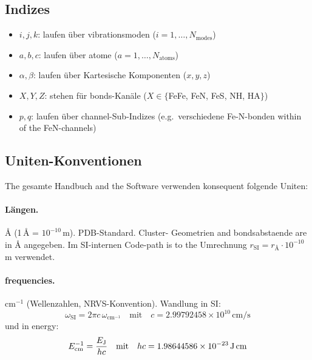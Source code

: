 \documentclass[11pt,a4paper,twoside]{article}
\providecommand{\angstrom}{\text{\AA}}    %
\theoremstyle{remark}
\begin{document}
\subsection{Indizes}

\begin{itemize}\setlength{\itemsep}{2pt}
  \item $i, j, k$: laufen \"uber vibrationsmoden ($i = 1, \ldots,
        N_\text{modes}$)
  \item $a, b, c$: laufen \"uber atome ($a = 1, \ldots, N_\text{atoms}$)
  \item $\alpha, \beta$: laufen \"uber Kartesische Komponenten
        ($x, y, z$)
  \item $X, Y, Z$: stehen f\"ur bonds-Kan\"ale
        ($X \in \{$FeFe, FeN, FeS, NH, HA$\}$)
  \item $p, q$: laufen \"uber channel-Sub-Indizes (e.g.\ verschiedene
        Fe-N-bonden within of the FeN-channels)
\end{itemize}

\subsection{Uniten-Konventionen}

The gesamte Handbuch and the Software verwenden konsequent
folgende Uniten:

\paragraph{L\"angen.}
$\angstrom$ (1\,$\angstrom$ = $10^{-10}$\,m). PDB-Standard. Cluster-
Geometrien and bondsabstaende are in $\angstrom$ angegeben.
Im SI-internen Code-path is to the Umrechnung
$r_\text{SI} = r_{\angstrom} \cdot 10^{-10}$\,m verwendet.

\paragraph{frequencies.}
cm$^{-1}$ (Wellenzahlen, NRVS-Konvention). Wandlung in SI:
\begin{equation}
  \omega_\text{SI} = 2\pi c\,\omega_{\text{cm}^{-1}}
  \quad\text{mit}\quad c = 2.99792458 \times 10^{10}\,\text{cm/s}
\end{equation}
und in energy:
\begin{equation}
  E_\text{cm}^{-1} = \frac{E_\text{J}}{h c}
  \quad\text{mit}\quad h c = 1.98644586 \times 10^{-23}\,\text{J\,cm}
\end{equation}
\end{document}
